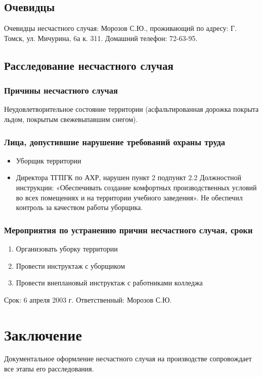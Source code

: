 \subsection{Очевидцы}
Очевидцы несчастного случая: Морозов С.Ю., проживающий по адресу: Г. Томск, ул. Мичурина, 6а к. 311. Домашний телефон: 72-63-95.

\subsection{Расследование несчастного случая}
\subsubsection{Причины несчастного случая}
Неудовлетворительное состояние территории (асфальтированная дорожка покрыта льдом, покрытым свежевыпавшим снегом).
\subsubsection{Лица, допустившие нарушение требований охраны труда}
\begin{itemize}
    \item Уборщик территории
    \item Директора ТГПГК по АХР, нарушен пункт 2 подпункт 2.2 Должностной инструкции: «Обеспечивать создание комфортных производственных условий во всех помещениях и на территории учебного заведения». Не обеспечил контроль за качеством работы уборщика.
\end{itemize}
\subsubsection{Мероприятия по устранению причин несчастного случая, сроки}
\begin{enumerate}
    \item Организовать уборку территории
    \item Провести инструктаж с уборщиком
    \item Провести внеплановый инструктаж с работниками колледжа
\end{enumerate}
Срок: 6 апреля 2003 г. Ответственный: Морозов С.Ю.



\section{Заключение}
Документальное оформление несчастного случая на производстве сопровождает все этапы его расследования.


